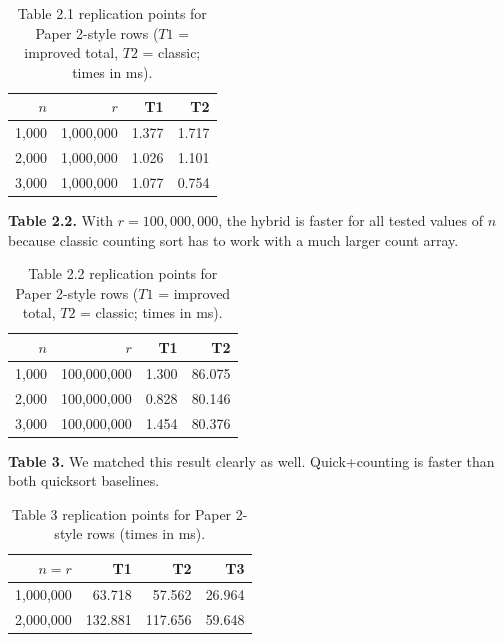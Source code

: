 \documentclass[11pt]{article}
\begin{document}
    \begin{table}[H]
        \centering
        \caption{Table 2.1 replication points for Paper 2-style rows ($T1$ = improved total, $T2$ = classic; times in ms).}
        \label{tab:table22-paper-points}
        \small
        \begin{tabular}{rrrr}
            \toprule
            $n$ & $r$ & T1 & T2 \\
            \midrule
            1{,}000 & 1{,}000{,}000 & 1.377 & 1.717 \\
            2{,}000 & 1{,}000{,}000 & 1.026 & 1.101 \\
            3{,}000 & 1{,}000{,}000 & 1.077 & 0.754 \\
            \bottomrule
        \end{tabular}
        \normalsize
    \end{table}

    \textbf{Table 2.2.} With $r=100{,}000{,}000$, the hybrid is faster for all tested values of
    $n$ because classic counting sort has to work with a much larger count array.
    \begin{table}[H]
        \centering
        \caption{Table 2.2 replication points for Paper 2-style rows ($T1$ = improved total, $T2$ = classic; times in ms).}
        \label{tab:table21-paper-points}
        \small
        \begin{tabular}{rrrr}
            \toprule
            $n$ & $r$ & T1 & T2 \\
            \midrule
            1{,}000 & 100{,}000{,}000 & 1.300 & 86.075 \\
            2{,}000 & 100{,}000{,}000 & 0.828 & 80.146 \\
            3{,}000 & 100{,}000{,}000 & 1.454 & 80.376 \\
            \bottomrule
        \end{tabular}
        \normalsize
    \end{table}

    \textbf{Table 3.} We matched this result clearly as well. Quick+counting is faster than both
    quicksort baselines.

    \begin{table}[H]
        \centering
        \caption{Table 3 replication points for Paper 2-style rows (times in ms).}
        \label{tab:table3-paper-points}
        \small
        \begin{tabular}{rrrr}
            \toprule
            $n=r$ & T1 & T2 & T3 \\
            \midrule
            1{,}000{,}000 & 63.718 & 57.562 & 26.964 \\
            2{,}000{,}000 & 132.881 & 117.656 & 59.648 \\
            \bottomrule
        \end{tabular}
        \normalsize
    \end{table}
\end{document}
